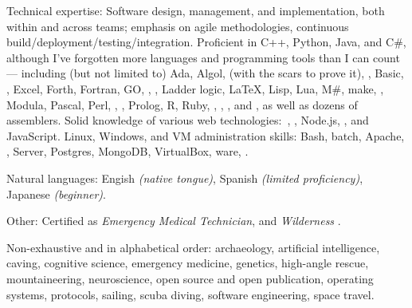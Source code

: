 \documentclass[10pt,a4paper]{article}
\begin{document}
\spacedhrule{0.5em}{-0.4em}


\inlineheadsection  %
  {Technical expertise:}
  {Software design, management, and implementation, both within and across teams; emphasis on agile methodologies, continuous build/deployment/testing/integration.  
  Proficient in C++, Python, Java, and C\#, although I've forgotten more languages and programming tools than I can count --- including (but not limited to) 
  Ada, Algol, \small{(with the scars to prove it)}, , Basic, , Excel, Forth, Fortran, GO, , , Ladder logic, \LaTeX, Lisp, Lua, M\#, make, , Modula, Pascal, Perl, , , Prolog, R, Ruby, , , , and , as well as dozens of assemblers.
  Solid knowledge of various web technologies:\ , , Node.js, ,  and JavaScript.
  Linux, Windows, and VM administration skills: Bash, batch, Apache, ,  Server, Postgres, MongoDB, VirtualBox, ware, .}

\vspace{0.5em}
\inlineheadsection
  {Natural languages:}
  {Engish \emph{(native tongue)}, Spanish \emph{(limited proficiency)}, Japanese \emph{(beginner)}.}

\vspace{0.5em}
\inlineheadsection
  {Other:}
  {Certified as \emph{Emergency Medical Technician}, and \emph{Wilderness }.}

\spacedhrule{1.6em}{-0.4em}


\inlineheadsection
  {Non-exhaustive and in alphabetical order:}
  {archaeology, artificial intelligence, caving, cognitive science, emergency medicine, genetics, high-angle rescue, mountaineering, neuroscience, open source and open publication, operating systems, protocols, sailing, scuba diving, software engineering, space travel.}
\end{document}
